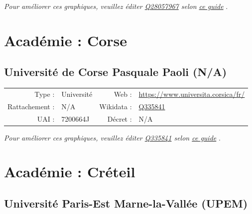 \documentclass[12pt,french,landscape]{article}
\begin{document}
\textit{\scriptsize Pour améliorer ces graphiques, veuillez éditer \href{https://www.wikidata.org/entity/Q28057967}{Q28057967}  selon \href{https://github.com/cpesr/wikidataESR/blob/master/Rmd/wikidataESR.md}{ce guide}}
.


\newpage

\hypertarget{acaduxe9mie-corse}{%
\section{Académie : Corse}\label{acaduxe9mie-corse}}

\hypertarget{universituxe9-de-corse-pasquale-paoli-na}{%
\subsection{Université de Corse Pasquale Paoli
(N/A)}\label{universituxe9-de-corse-pasquale-paoli-na}}

\begin{tabular*}{0.45\textwidth}{rp{2cm}rl}  
\hline  
Type : & Université & Web : &\href{https://www.universita.corsica/fr/}{https://www.universita.corsica/fr/} \\  
Rattachement : & N/A & Wikidata : & \href{https://www.wikidata.org/entity/Q335841}{Q335841} \\  
UAI : & 7200664J & Décret : & N/A \\  
\hline  
\end{tabular*}

\textit{\scriptsize Pour améliorer ces graphiques, veuillez éditer \href{https://www.wikidata.org/entity/Q335841}{Q335841}  selon \href{https://github.com/cpesr/wikidataESR/blob/master/Rmd/wikidataESR.md}{ce guide}}
.


\newpage

\hypertarget{acaduxe9mie-cruxe9teil}{%
\section{Académie : Créteil}\label{acaduxe9mie-cruxe9teil}}

\hypertarget{universituxe9-paris-est-marne-la-valluxe9e-upem}{%
\subsection{Université Paris-Est Marne-la-Vallée
(UPEM)}\label{universituxe9-paris-est-marne-la-valluxe9e-upem}}
\end{document}

